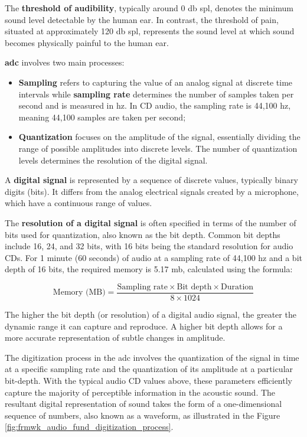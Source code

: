 The \textbf{threshold of audibility}, typically around 0 \gls{db} \gls{spl}, denotes the minimum sound level detectable by the human ear. In contrast, the threshold of pain, situated at approximately 120 \gls{db} \gls{spl}, represents the sound level at which sound becomes physically painful to the human ear. 

\textbf{\gls{adc}} involves two main processes: 
\begin{itemize}
    \item \textbf{Sampling} refers to capturing the value of an analog signal at discrete time intervals while \textbf{sampling rate} determines the number of samples taken per second and is measured in \gls{hz}. In CD audio, the sampling rate is 44,100 \gls{hz}, meaning 44,100 samples are taken per second;
    \item \textbf{Quantization} focuses on the amplitude of the signal, essentially dividing the range of possible amplitudes into discrete levels. The number of quantization levels determines the resolution of the digital signal.
\end{itemize}

A \textbf{digital signal} is represented by a sequence of discrete values, typically binary digits (bits). It differs from the analog electrical signals created by a microphone, which have a continuous range of values.

The \textbf{resolution of a digital signal} is often specified in terms of the number of bits used for quantization, also known as the bit depth. Common bit depths include 16, 24, and 32 bits, with 16 bits being the standard resolution for audio CDs. For 1 minute (60 seconds) of audio at a sampling rate of 44,100 \gls{hz} and a bit depth of 16 bits, the required memory is 5.17 \gls{m}\gls{b}, calculated using the formula: 

\begin{equation}
    \label{eq:frmwk_audio_fund_audio_memory_calculation}
\text{Memory (MB)} = \frac{\text{Sampling rate} \times \text{Bit depth} \times \text{Duration}}{8 \times 1024}
\end{equation}

The higher the bit depth (or resolution) of a digital audio signal, the greater the dynamic range it can capture and reproduce. A higher bit depth allows for a more accurate representation of subtle changes in amplitude.

The digitization process in the \gls{adc} involves the quantization of the signal in time at a specific sampling rate and the quantization of its amplitude at a particular bit-depth. With the typical audio CD values above, these parameters efficiently capture the majority of perceptible information in the acoustic sound. The resultant digital representation of sound takes the form of a one-dimensional sequence of numbers, also known as a waveform, as illustrated in the Figure \ref{fig:frmwk_audio_fund_digitization_process}.

